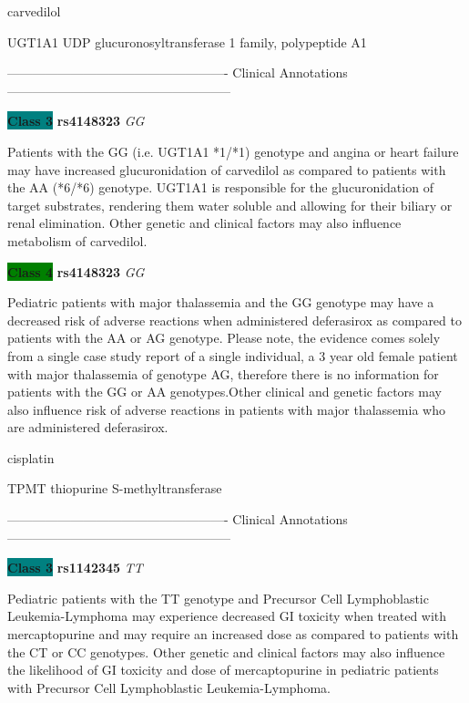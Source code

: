 \documentclass{resume} %
\begin{document}
\begin{rSection}{ carvedilol }
\begin{rSubsection}{ UGT1A1 }{ UDP glucuronosyltransferase 1 family, polypeptide A1 }{}{}
\item[] ---------------------------------------------------- Clinical Annotations -----------------------------------------------------\newline
\item \textbf{\colorbox{teal} {Class 3}} \textbf{ rs4148323 } \textit{ GG }
\item[] Patients with the GG (i.e. UGT1A1 *1/*1) genotype and angina or heart failure may have increased glucuronidation of carvedilol as compared to patients with the AA (*6/*6) genotype. UGT1A1 is responsible for the glucuronidation of target substrates, rendering them water soluble and allowing for their biliary or renal elimination. Other genetic and clinical factors may also influence metabolism of carvedilol.\item \textbf{\colorbox{green} {Class 4}} \textbf{ rs4148323 } \textit{ GG }
\item[] Pediatric patients with major thalassemia and the GG genotype may have a decreased risk of adverse reactions when administered deferasirox as compared to patients with the AA or AG genotype. Please note, the evidence comes solely from a single case study report of a single individual, a 3 year old female patient with major thalassemia of genotype AG, therefore there is no information for patients with the GG or AA genotypes.Other clinical and genetic factors may also influence risk of adverse reactions in patients with major thalassemia who are administered deferasirox.
\end{rSubsection}

\end{rSection}\begin{rSection}{ cisplatin }
\item[]

\begin{rSubsection}{ TPMT }{ thiopurine S-methyltransferase }{}{}
\item[]

\item[] ---------------------------------------------------- Clinical Annotations -----------------------------------------------------\newline
\item \textbf{\colorbox{teal} {Class 3}} \textbf{ rs1142345 } \textit{ TT }
\item[] Pediatric patients with the TT genotype and Precursor Cell Lymphoblastic Leukemia-Lymphoma may experience decreased GI toxicity when treated with mercaptopurine and may require an increased dose as compared to patients with the CT or CC genotypes. Other genetic and clinical factors may also influence the likelihood of GI toxicity and dose of mercaptopurine in pediatric patients with Precursor Cell Lymphoblastic Leukemia-Lymphoma.
\end{rSubsection}


\end{rSection}
\end{document}
